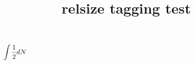 \documentclass{article}
\title{relsize tagging test}
\begin{document}

$\mathlarger{\int\frac{1}{2}dN}$
\end{document}
